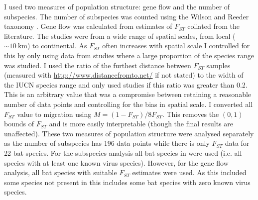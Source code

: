 I used two measures of population structure: gene flow and the number of subspecies.
The number of subspecies was counted using the Wilson and Reeder taxonomy \cite{wilson2005mammal}.
Gene flow was calculated from estimates of $F_{ST}$ collated from the literature.
The studies were from a wide range of spatial scales, from local ($\sim\SI{10}{\kilo\metre}$) to continental.
As $F_{ST}$ often increases with spatial scale \cite{burland1999population, hulva2010mechanisms, o2015genetic, vonhof2015range} I controlled for this by only using data from studies where a large proportion of the species range was studied.
I used the ratio of the furthest distance between $F_{ST}$ samples (measured with \url{http://www.distancefromto.net/} if not stated) to the width of the IUCN species range \cite{iucn} and only used studies if this ratio was greater than 0.2.
This is an arbitrary value that was a compromise between retaining a reasonable number of data points and controlling for the bias in spatial scale.
I converted all $F_{ST}$ value to migration using $M = (1-F_{ST})/8F_{ST}$.
This removes the $(0, 1)$ bounds of $F_{ST}$ and is more easily interpretable (though the final results are unaffected). 
These two measures of population structure were analysed separately as the number of subspecies has 196 data points while there is only $F_{ST}$ data for 22 bat species.
For the subspecies analysis all bat species in \textcite{luis2013comparison} were used (i.e. all species with at least one known virus species).
However, for the gene flow analysis, all bat species with suitable $F_{ST}$ estimates were used.
As this included some species not present in \textcite{luis2013comparison} this includes some bat species with zero known virus species. 




























